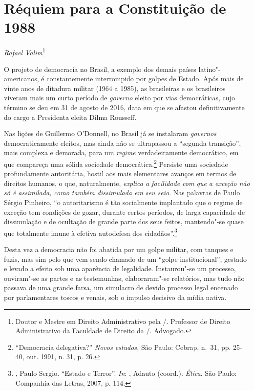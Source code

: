 \chapter*{Réquiem para a Constituição de 1988}


\begin{flushright}
\emph{Rafael Valim}\footnote{Doutor e Mestre em Direito Administrativo
pela /. Professor de Direito Administrativo da Faculdade de Direito
da /. Advogado.}
\end{flushright}

O projeto de democracia no Brasil, a exemplo dos demais países
latino"-americanos, é constantemente interrompido por golpes de Estado.
Após mais de vinte anos de ditadura militar (1964 a 1985), as
brasileiras e os brasileiros viveram mais um curto período de
\emph{governo} eleito por vias democráticas, cujo término se deu em 31
de agosto de 2016, data em que se afastou definitivamente do cargo a
Presidenta eleita Dilma Rousseff.

Nas lições de Guillermo O'Donnell, no Brasil já se instalaram
\emph{governos} democraticamente eleitos, mas ainda não se ultrapassou a
``segunda transição'', mais complexa e demorada, para um \emph{regime}
verdadeiramente democrático, em que compareça uma sólida sociedade
democrática.\footnote{``Democracia delegativa?'' \emph{Novos estudos,}
  São Paulo: Cebrap, n.~31, pp. 25-40, out. 1991, n. 31, p. 26.}
Persiste uma sociedade profundamente autoritária, hostil aos mais
elementares avanços em termos de direitos humanos, o que, naturalmente,
\emph{explica a facilidade com que a exceção não só é assimilada, como
também dissimulada em seu seio}. Nas palavras de Paulo Sérgio Pinheiro,
``o autoritarismo é tão socialmente implantado que o regime de exceção
tem condições de gozar, durante certos períodos, de larga capacidade de
dissimulação e de ocultação de grande parte dos seus feitos, mantendo"-se
quase que totalmente imune à efetiva autodefesa dos
cidadãos''.\footnote{, Paulo Sergio. ``Estado e Terror''.
  \emph{In}: , Adauto (coord.). \emph{Ética}. São Paulo: Companhia
  das Letras, 2007, p. 114.}

Desta vez a democracia não foi abatida por um golpe militar, com tanques
e fuzis, mas sim pelo que vem sendo chamado de um ``golpe
institucional'', gestado e levado a efeito sob uma aparência de
legalidade. Instaurou"-se um processo, ouviram"-se as partes e as
testemunhas, elaboraram"-se relatórios, mas tudo não passava de uma
grande farsa, um simulacro de devido processo legal encenado por
parlamentares toscos e venais, sob o impulso decisivo da mídia nativa.

